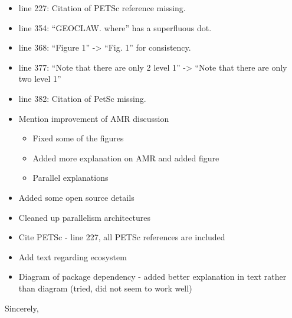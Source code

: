 \documentclass{letter}
\begin{document}
\begin{letter}
\begin{itemize}
    \item line 227: Citation of PETSc reference missing.

    \item line 354: ``GEOCLAW. where'' has a superfluous dot.

    \item line 368: ``Figure 1'' -> ``Fig. 1'' for consistency.

    \item line 377: ``Note that there are only 2 level 1'' -> ``Note that there
    are only two level 1''

    \item line 382: Citation of PetSc missing.
\end{itemize}

\begin{itemize}
    \item Mention improvement of AMR discussion
    \begin{itemize}
        \item Fixed some of the figures
        \item Added more explanation on AMR and added figure
        \item Parallel explanations
    \end{itemize}
    \item Added some open source details
    \item Cleaned up parallelism architectures
    \item Cite PETSc - line 227, all PETSc references are included
    \item Add text regarding ecosystem
    \item Diagram of package dependency - added better explanation in text
    rather than diagram (tried, did not seem to work well)
\end{itemize}


\vspace{4cm}

\closing{Sincerely,}

\end{letter}
\end{document}
